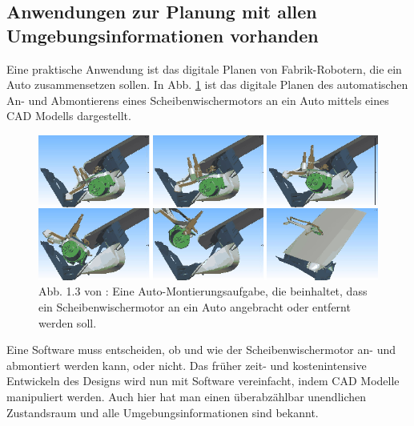 \subsection{Anwendungen zur Planung mit allen Umgebungsinformationen vorhanden}%
Eine praktische Anwendung ist das digitale Planen von Fabrik-Robotern, die ein Auto zusammensetzen sollen. In Abb. \ref{Abb. 5.2} ist das digitale Planen des automatischen An- und Abmontierens eines Scheibenwischermotors an ein Auto mittels eines CAD Modells dargestellt.
\begin{figure}
	\centering
	\includegraphics[width=0.7\linewidth]{images/img231}
	\caption{Abb. 1.3 von \cite[~S. 7]{Lav06}: Eine Auto-Montierungsaufgabe, die beinhaltet, dass ein Scheibenwischermotor an ein Auto angebracht oder entfernt werden soll.}
	\label{Abb. 5.2}
\end{figure}

Eine Software muss entscheiden, ob und wie der Scheibenwischermotor an- und abmontiert werden kann, oder nicht. Das früher zeit- und kostenintensive Entwickeln des Designs wird nun mit Software vereinfacht, indem CAD Modelle manipuliert werden. Auch hier hat man einen überabzählbar unendlichen Zustandsraum und alle Umgebungsinformationen sind bekannt. \cite[~S. 6 ff]{Lav06}
